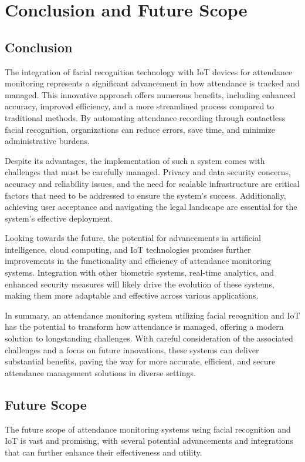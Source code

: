 \documentclass[12pt,a4paper]{report}
\begin{document}
\newpage
\chapter{Conclusion and Future Scope}
\section{Conclusion}
\par The integration of facial recognition technology with IoT devices for attendance monitoring represents a significant advancement in how attendance is tracked and managed. This innovative approach offers numerous benefits, including enhanced accuracy, improved efficiency, and a more streamlined process compared to traditional methods. By automating attendance recording through contactless facial recognition, organizations can reduce errors, save time, and minimize administrative burdens.\\
\par Despite its advantages, the implementation of such a system comes with challenges that must be carefully managed. Privacy and data security concerns, accuracy and reliability issues, and the need for scalable infrastructure are critical factors that need to be addressed to ensure the system's success. Additionally, achieving user acceptance and navigating the legal landscape are essential for the system's effective deployment.\\
\par Looking towards the future, the potential for advancements in artificial intelligence, cloud computing, and IoT technologies promises further improvements in the functionality and efficiency of attendance monitoring systems. Integration with other biometric systems, real-time analytics, and enhanced security measures will likely drive the evolution of these systems, making them more adaptable and effective across various applications.\\
\par In summary, an attendance monitoring system utilizing facial recognition and IoT has the potential to transform how attendance is managed, offering a modern solution to longstanding challenges. With careful consideration of the associated challenges and a focus on future innovations, these systems can deliver substantial benefits, paving the way for more accurate, efficient, and secure attendance management solutions in diverse settings.\\

\newpage
\section{Future Scope}
\par The future scope of attendance monitoring systems using facial recognition and IoT is vast and promising, with several potential advancements and integrations that can further enhance their effectiveness and utility.
\end{document}
